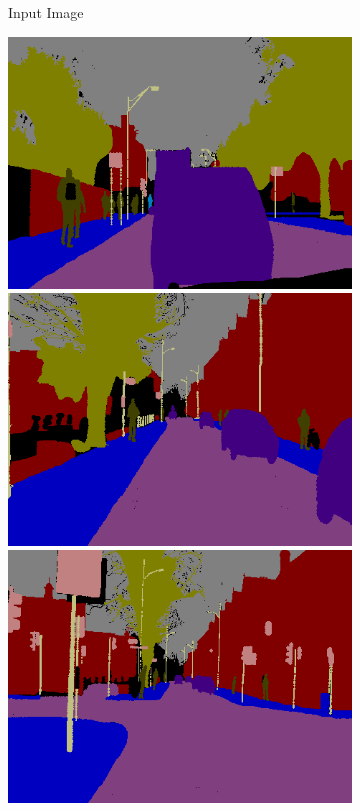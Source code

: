 \begin{figure}[t]
{\begin{subfigure}[t]{0.22\linewidth}
        \caption{Input Image}
    \end{subfigure}
    \begin{subfigure}[t]{0.22\linewidth}
        \centering
		\includegraphics[width=\linewidth]{segnet_1_output_2.png}
        \vspace{1px}
		\includegraphics[width=\linewidth]{segnet_13_output_2.png}
        \vspace{1px}
        \includegraphics[width=\linewidth]{segnet_2_output_2.png}

\end{subfigure}}
\end{figure}
